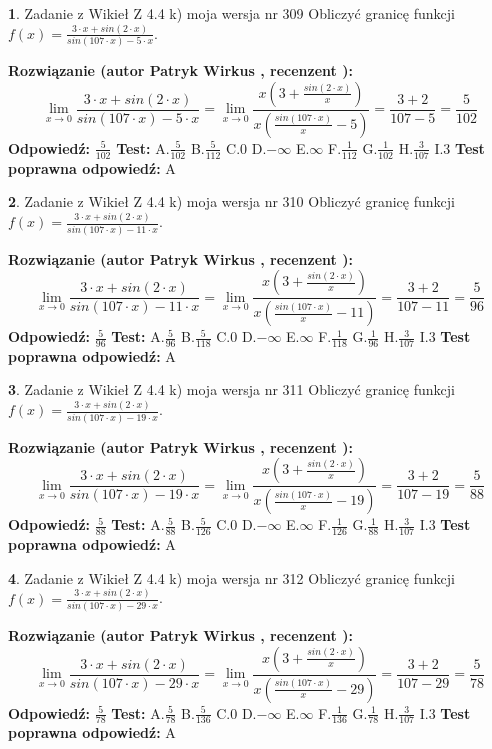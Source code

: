 \documentclass[12pt, a4paper]{article}
\theoremstyle{definition} %
\newtheorem{zad}{}
\newcommand{\zadStart}[1]{\begin{zad}#1\newline}
\newcommand{\zadStop}{\end{zad}}
\newcommand{\rozwStart}[2]{\noindent \textbf{Rozwiązanie (autor #1 , recenzent #2): }\newline}
\newcommand{\rozwStop}{\newline}
\newcommand{\odpStart}{\noindent \textbf{Odpowiedź:}\newline}
\newcommand{\odpStop}{\newline}
\newcommand{\testStart}{\noindent \textbf{Test:}\newline}
\newcommand{\testStop}{\newline}
\newcommand{\kluczStart}{\noindent \textbf{Test poprawna odpowiedź:}\newline}
\newcommand{\kluczStop}{\newline}
\begin{document}
\zadStart{Zadanie z Wikieł Z 4.4 k) moja wersja nr 309}
Obliczyć granicę funkcji $f(x)=\frac{3\cdot x +sin(2\cdot x)}{sin(107\cdot x) -5\cdot x}$.
\zadStop
\rozwStart{Patryk Wirkus}{}
$$\lim\limits_{x\to 0}\frac{3\cdot x +sin(2\cdot x)}{sin(107\cdot x) -5\cdot x}
=\lim\limits_{x\to 0}\frac{x(3+\frac{sin(2\cdot x)}{x})}{x(\frac{sin(107\cdot x)}{x}-5)}
=\frac{3+2}{107-5} = \frac{5}{102}$$
\rozwStop
\odpStart
$\frac{5}{102}$
\odpStop
\testStart
A.$\frac{5}{102}$
B.$\frac{5}{112}$
C.$0$
D.$-\infty$
E.$\infty$
F.$\frac{1}{112}$
G.$\frac{1}{102}$
H.$\frac{3}{107}$
I.$3$
\testStop
\kluczStart
A
\kluczStop



\zadStart{Zadanie z Wikieł Z 4.4 k) moja wersja nr 310}
Obliczyć granicę funkcji $f(x)=\frac{3\cdot x +sin(2\cdot x)}{sin(107\cdot x) -11\cdot x}$.
\zadStop
\rozwStart{Patryk Wirkus}{}
$$\lim\limits_{x\to 0}\frac{3\cdot x +sin(2\cdot x)}{sin(107\cdot x) -11\cdot x}
=\lim\limits_{x\to 0}\frac{x(3+\frac{sin(2\cdot x)}{x})}{x(\frac{sin(107\cdot x)}{x}-11)}
=\frac{3+2}{107-11} = \frac{5}{96}$$
\rozwStop
\odpStart
$\frac{5}{96}$
\odpStop
\testStart
A.$\frac{5}{96}$
B.$\frac{5}{118}$
C.$0$
D.$-\infty$
E.$\infty$
F.$\frac{1}{118}$
G.$\frac{1}{96}$
H.$\frac{3}{107}$
I.$3$
\testStop
\kluczStart
A
\kluczStop



\zadStart{Zadanie z Wikieł Z 4.4 k) moja wersja nr 311}
Obliczyć granicę funkcji $f(x)=\frac{3\cdot x +sin(2\cdot x)}{sin(107\cdot x) -19\cdot x}$.
\zadStop
\rozwStart{Patryk Wirkus}{}
$$\lim\limits_{x\to 0}\frac{3\cdot x +sin(2\cdot x)}{sin(107\cdot x) -19\cdot x}
=\lim\limits_{x\to 0}\frac{x(3+\frac{sin(2\cdot x)}{x})}{x(\frac{sin(107\cdot x)}{x}-19)}
=\frac{3+2}{107-19} = \frac{5}{88}$$
\rozwStop
\odpStart
$\frac{5}{88}$
\odpStop
\testStart
A.$\frac{5}{88}$
B.$\frac{5}{126}$
C.$0$
D.$-\infty$
E.$\infty$
F.$\frac{1}{126}$
G.$\frac{1}{88}$
H.$\frac{3}{107}$
I.$3$
\testStop
\kluczStart
A
\kluczStop



\zadStart{Zadanie z Wikieł Z 4.4 k) moja wersja nr 312}
Obliczyć granicę funkcji $f(x)=\frac{3\cdot x +sin(2\cdot x)}{sin(107\cdot x) -29\cdot x}$.
\zadStop
\rozwStart{Patryk Wirkus}{}
$$\lim\limits_{x\to 0}\frac{3\cdot x +sin(2\cdot x)}{sin(107\cdot x) -29\cdot x}
=\lim\limits_{x\to 0}\frac{x(3+\frac{sin(2\cdot x)}{x})}{x(\frac{sin(107\cdot x)}{x}-29)}
=\frac{3+2}{107-29} = \frac{5}{78}$$
\rozwStop
\odpStart
$\frac{5}{78}$
\odpStop
\testStart
A.$\frac{5}{78}$
B.$\frac{5}{136}$
C.$0$
D.$-\infty$
E.$\infty$
F.$\frac{1}{136}$
G.$\frac{1}{78}$
H.$\frac{3}{107}$
I.$3$
\testStop
\kluczStart
A
\kluczStop
\end{document}
